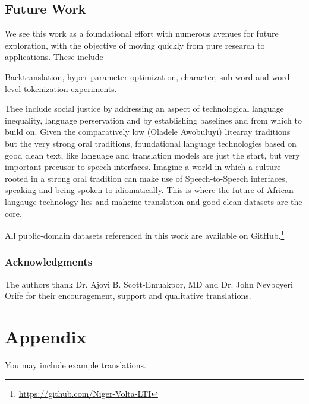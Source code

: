 \documentclass{article} %
\begin{document}
\subsection{Future Work}
We see this work as a foundational effort with numerous avenues for future exploration, with the objective of moving quickly from pure research to applications. These include 

Backtranslation, hyper-parameter optimization, character, sub-word and word-level tokenization experiments. 
 
 Thee include social justice by addressing an aspect of technological language inequality, language perservation and by establishing baselines and from which to build on. Given the comparatively low (Oladele Awobuluyi) litearay traditions but the very strong oral traditions, foundational language technologies based on good clean text, like language and translation models are just the start, but very important precusor to speech interfaces. Imagine a world in which a culture rooted in a strong oral tradition can make use of Speech-to-Speech interfaces, speaking and being spoken to idiomatically. This is where the future of African langauge technology lies and mahcine translation and good clean datasets are the core.   




All public-domain datasets referenced in this work are available on GitHub.\footnote{\url{https://github.com/Niger-Volta-LTI}}

\subsubsection*{Acknowledgments}
The authors thank Dr. Ajovi B. Scott-Emuakpor, MD and Dr. John Nevboyeri Orife for their encouragement, support and qualitative translations.




\appendix
\section{Appendix}
You may include example translations. 
\end{document}
